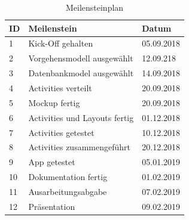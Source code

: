 \begin{table}[H]
\caption{Meilensteinplan} %
\begin{tabular}{|p{2cm}|p{9cm}|p{3cm}|}
\hline
{\textbf{ID}} & {\textbf{Meilenstein}} & {\textbf{Datum}} \\ \hline
1 & Kick-Off gehalten & 05.09.2018 \\ \hline
2 & Vorgehensmodell ausgewählt & 12.09.218 \\ \hline
3 & Datenbankmodel ausgewählt & 14.09.2018 \\ \hline 
4 & Activities verteilt & 20.09.2018 \\ \hline
5 & Mockup fertig & 20.09.2018 \\ \hline
6 & Activities und Layouts fertig & 01.12.2018 \\ \hline
7 & Activities getestet & 10.12.2018 \\ \hline
8 & Activities zusammengeführt & 20.12.2018 \\ \hline
9 & App getestet & 05.01.2019 \\ \hline
10 & Dokumentation fertig & 01.02.2019 \\ \hline
11 & Ausarbeitungsabgabe & 07.02.2019 \\ \hline
12  & Präsentation & 09.02.2019\\ \hline
\end{tabular}
\end{table}

